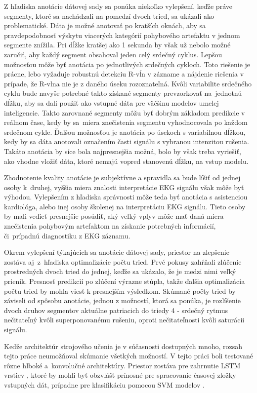 Z hľadiska anotácie dátovej sady sa ponúka niekoľko vylepšení, keďže práve segmenty, ktoré sa nachádzali na pomedzí dvoch tried, sa ukázali ako problematické. Dáta je možné anotovať po kratších oknách, aby sa pravdepodobnosť výskytu viacerých kategórií pohybového artefaktu v jednom segmente znížila. Pri dĺžke kratšej ako 1 sekunda by však už nebolo možné zaručiť, aby každý segment obsahoval jeden celý srdečný cyklus. Lepšou možnosťou môže byť anotácia po jednotlivých srdečných cykloch. Toto riešenie je prácne, lebo vyžaduje robustnú detekciu R-vĺn v zázname a nájdenie riešenia v prípade, že R-vlna nie je z daného úseku rozoznateľná. Kvôli variabilite srdečného cyklu bude navyše potrebné takto získané segmenty prevzorkovať na~jednotnú dĺžku, aby sa dali použiť ako vstupné dáta pre väčšinu modelov umelej inteligencie. Takto zarovnané segmenty môžu byť dobrým základom predikcie v reálnom čase, kedy by sa~miera znečistenia segmentu vyhodnocovala po každom srdečnom cykle. Ďalšou možnosťou je anotácia po úsekoch s variabilnou dĺžkou, kedy by sa dáta anotovali označením časti signálu s vybranou intenzitou rušenia. Takáto anotácia by síce bola najpresnejšia možná, bolo by však treba vyriešiť, ako vhodne vložiť dáta, ktoré nemajú vopred stanovenú dĺžku, na vstup modelu.

Zhodnotenie kvality anotácie je subjektívne a spravidla sa bude líšiť od jednej osoby k~druhej, vyššia miera znalosti interpretácie EKG signálu však môže byť výhodou. Vylepšením z hľadiska správnosti môže teda byť anotácia s asistenciou kardiológa, alebo inej osoby školenej na interpretáciu EKG signálu. Tieto osoby by mali vedieť presnejšie posúdiť, aký veľký vplyv môže mať daná miera znečistenia pohybovým artefaktom na získanie potrebných informácií, či~prípadnú diagnostiku z EKG záznamu.

Okrem vylepšení týkajúcich sa anotácie dátovej sady, priestor na zlepšenie zostáva aj~z~hľadiska optimalizácie počtu tried. Prvé pokusy zahŕňali zlúčenie prostredných dvoch tried do jednej, keďže sa ukázalo, že je medzi nimi veľký prienik. Presnosť predikcií po zlúčení výrazne stúpla, takže ďalšia optimalizácia počtu tried by mohla viesť k presnejším výsledkom. Skúmané počty tried by záviseli od spôsobu anotácie, jednou z možností, ktorá sa ponúka, je rozlíšenie dvoch druhov segmentov aktuálne patriacich do triedy 4 - srdečný rytmus nečitateľný kvôli superponovanému rušeniu, oproti nečitateľnosti kvôli saturácii signálu.

Keďže architektúr strojového učenia je v súčasnosti dostupných mnoho, rozsah tejto práce neumožňoval skúmanie všetkých možností. V tejto práci boli testované rôzne hlboké a~konvolučné architektúry. Priestor zostáva pre zahrnutie LSTM vrstiev \cite{boljanic2022}, ktoré by mohli byť obzvlášť prínosné pre spracovanie časovej zložky vstupných dát, prípadne pre klasifikáciu pomocou SVM modelov \cite{Castao2017}\cite{Kher2015}.



